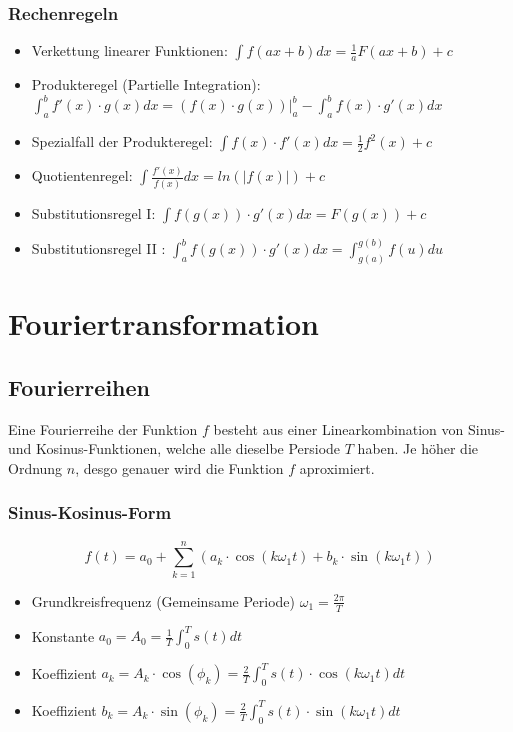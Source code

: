\subsubsection{Rechenregeln}
\begin{itemize}
  \item Verkettung linearer Funktionen: $\int f(ax+b)dx = \frac{1}{a}F(ax+b) + c$
  \item Produkteregel (Partielle Integration): $\int_a^b f'(x) \cdot g(x) dx =
    (f(x) \cdot g(x))|^b_a - \int_a^b f(x) \cdot g'(x) dx$
  \item Spezialfall der Produkteregel: $\int f(x) \cdot f'(x) dx = \frac{1}{2}f^2(x) + c$
  \item Quotientenregel: $\int \frac{f'(x)}{f(x)}dx = ln(|f(x)|) + c$
  \item Substitutionsregel I: $ \int f(g(x)) \cdot g'(x) dx = F(g(x)) + c$
  \item Substitutionsregel II : $ \int_a^b f(g(x)) \cdot g'(x) dx =
    \int_{g(a)}^{g(b)} f(u) du$
\end{itemize}


\section{Fouriertransformation}
\subsection{Fourierreihen}
Eine Fourierreihe der Funktion $f$ besteht aus einer Linearkombination
von Sinus- und Kosinus-Funktionen, welche alle dieselbe Persiode $T$
haben. Je höher die Ordnung $n$, desgo genauer wird die Funktion $f$ aproximiert.

\subsubsection{Sinus-Kosinus-Form}
\[
  f(t) = a_0 + \sum_{k=1}^{n}
  (a_k \cdot \cos(k \omega_1 t) + b_k \cdot \sin(k \omega_1 t))
\]
\begin{itemize}
  \item Grundkreisfrequenz (Gemeinsame Periode) $\omega_1 = \frac{2\pi}{T}$
  \item Konstante $a_0 = A_0 = \frac{1}{T}\int_0^T s(t) dt$
  \item Koeffizient $a_k = A_k \cdot \cos(\phi_k) =
    \frac{2}{T} \int_0^T s(t) \cdot \cos(k \omega_1 t) dt$
  \item Koeffizient $b_k = A_k \cdot \sin(\phi_k) =
    \frac{2}{T} \int_0^T s(t) \cdot \sin(k \omega_1 t) dt$
\end{itemize}

